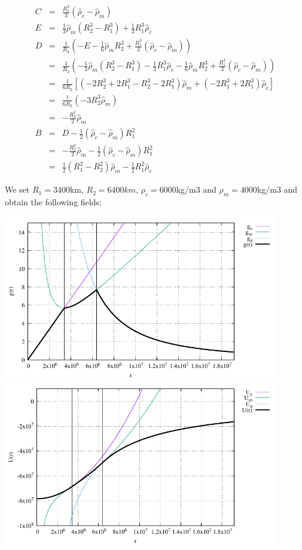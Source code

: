 \begin{eqnarray}
C &=&\frac{R_1^3}{3} (\hat{\rho}_c-\hat{\rho}_m) \\
E &=& \frac13 \hat{\rho}_m (R_2^3-R_1^3) +  \frac13 R_1^3 \hat{\rho}_c \\
D 
&=& \frac{1}{R_2}\left( -E -\frac{1}{6}\hat{\rho}_m R_2^3  +\frac{R_1^3}{3} (\hat{\rho}_c-\hat{\rho}_m) \right)\\
&=& \frac{1}{R_2}\left( -\frac13 \hat{\rho}_m (R_2^3-R_1^3) -  \frac13 R_1^3 \hat{\rho}_c -\frac{1}{6}\hat{\rho}_m R_2^3  +\frac{R_1^3}{3} (\hat{\rho}_c-\hat{\rho}_m) \right)\\
&=& \frac{1}{6 R_2}  \left[
( -2R_2^3 + 2R_1^3 - R_2^3 -2 R_1^3 )\hat{\rho}_m +
( -2R_1^3 + 2R_1^3 )\hat{\rho}_c 
\right] \\
&=& \frac{1}{6 R_2}  \left( -3R_2^3 \hat{\rho}_m \right) \\
&=& -\frac{R_2^2}{2}  \hat{\rho}_m  \\
B &=& D-\frac12(\hat{\rho}_c-\hat{\rho}_m) R_1^2  \\
&=&  -\frac{R_2^2}{2}  \hat{\rho}_m   -\frac12(\hat{\rho}_c-\hat{\rho}_m) R_1^2  \\
&=& \frac12 ( R_1^2 -R_2^2 ) \hat{\rho}_m - \frac12  R_1^2  \hat{\rho}_c
\end{eqnarray}

We set $R_1=3400$km, $R_2=6400km$, $\rho_c=6000$kg/m3 and $\rho_m=4000$kg/m3
and obtain the following fields:  

\begin{center}
\includegraphics[width=12cm]{images/gravity_benchmark2/g.pdf}\\
\includegraphics[width=12cm]{images/gravity_benchmark2/U.pdf}
\end{center}

